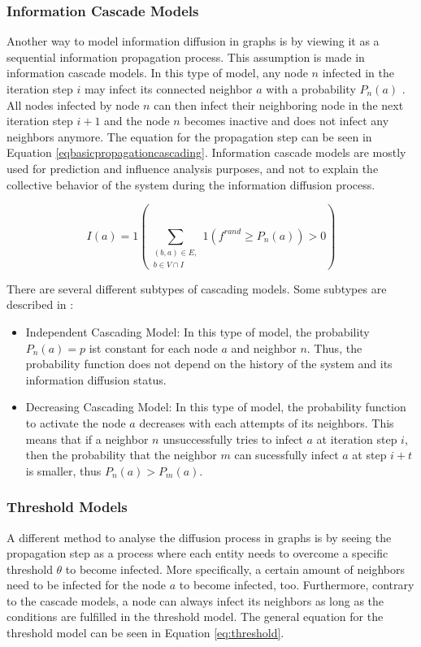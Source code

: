 \subsubsection{Information Cascade Models}

Another way to model information diffusion in graphs is by viewing it as a 
sequential information propagation process. This assumption is made in
information cascade models. In this type of model, any node $n$ infected in the
iteration step $i$ may infect its connected neighbor $a$ with a probability $P_n(a)$
\cite{reviewinformationdiffusion}. All nodes infected by node $n$
can then infect their neighboring node in the next iteration step $i+1$
and the node $n$ becomes inactive and does not infect any neighbors anymore.
The equation for the propagation step can be seen in Equation 
\ref{eqbasicpropagationcascading}.
Information cascade models are mostly used for prediction and influence 
analysis purposes, and not to explain the collective behavior
of the system during the information diffusion process.

\begin{equation}
    I(a) = 1 (\sum\limits_{\substack{(b,a)\in E, \\ b \in V \cap I}}
    1(f^{rand}\geq P_n(a))>0) 
    \label{eqbasicpropagationcascading}
\end{equation}

There are several different subtypes of cascading models.
Some subtypes are described in \cite{diffusionbasics}:

\begin{itemize}
    \item Independent Cascading Model: In this type of model, the 
    probability $P_n(a)=p$ ist constant for each node $a$ and neighbor $n$.
    Thus, the probability function does not depend on the history 
    of the system and its information diffusion status.
    \item Decreasing Cascading Model: In this type of model, the probability
    function to activate the node $a$ decreases with each attempts of its 
    neighbors. This means that if a neighbor $n$ unsuccessfully tries to infect
    $a$ at iteration step $i$, then the probability that the neighbor $m$
    can sucessfully infect $a$ at step $i+t$ is smaller, thus $P_n(a)>P_m(a)$.
\end{itemize}

\subsubsection{Threshold Models}
A different method to analyse the diffusion process in graphs is by seeing the
propagation step as a process where each entity needs to overcome a 
specific threshold $\theta$ to become infected. More specifically, 
a certain amount of neighbors need to be infected for the node $a$ to become 
infected, too. Furthermore, contrary to the cascade models, a node can always 
infect its neighbors as long as the conditions are fulfilled in the threshold 
model. The general equation for the threshold model can be seen in Equation
\ref{eq:threshold}.

